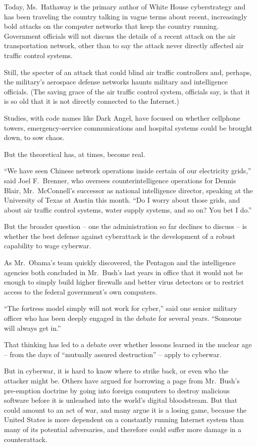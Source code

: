 \documentclass[12pt,a4paper,onecolumn]{article}
\begin{document}
Today, Ms.~Hathaway is the primary author of White House cyberstrategy and has been traveling the
country talking in vague terms about recent, increasingly bold attacks on the computer networks that
keep the country running. Government officials will not discuss the details of a recent attack on
the air transportation network, other than to say the attack never directly affected air traffic
control systems.

Still, the specter of an attack that could blind air traffic controllers and, perhaps, the
military's aerospace defense networks haunts military and intelligence officials. (The saving grace
of the air traffic control system, officials say, is that it is so old that it is not directly
connected to the Internet.)

Studies, with code names like Dark Angel, have focused on whether cellphone towers,
emergency-service communications and hospital systems could be brought down, to sow chaos.

But the theoretical has, at times, become real.

``We have seen Chinese network operations inside certain of our electricity grids,'' said Joel
F.~Brenner, who oversees counterintelligence operations for Dennis Blair, Mr.~McConnell's successor
as national intelligence director, speaking at the University of Texas at Austin this month. ``Do I
worry about those grids, and about air traffic control systems, water supply systems, and so on? You
bet I do.''

But the broader question -- one the administration so far declines to discuss -- is whether the best
defense against cyberattack is the development of a robust capability to wage cyberwar.

As Mr.~Obama's team quickly discovered, the Pentagon and the intelligence agencies both concluded in
Mr.~Bush's last years in office that it would not be enough to simply build higher firewalls and
better virus detectors or to restrict access to the federal government's own computers.

``The fortress model simply will not work for cyber,'' said one senior military officer who has been
deeply engaged in the debate for several years. ``Someone will always get in.''

That thinking has led to a debate over whether lessons learned in the nuclear age -- from the days
of ``mutually assured destruction'' -- apply to cyberwar.

But in cyberwar, it is hard to know where to strike back, or even who the attacker might be. Others
have argued for borrowing a page from Mr.~Bush's pre-emption doctrine by going into foreign
computers to destroy malicious software before it is unleashed into the world's digital bloodstream.
But that could amount to an act of war, and many argue it is a losing game, because the United
States is more dependent on a constantly running Internet system than many of its potential
adversaries, and therefore could suffer more damage in a counterattack.
\end{document}
